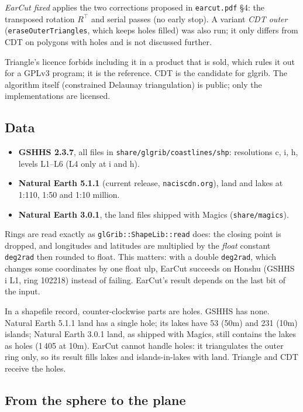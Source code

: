 \documentclass[11pt,a4paper]{article}
\newcommand{\code}[1]{\texttt{#1}}
\begin{document}
\noindent\emph{EarCut fixed} applies the two corrections proposed in \code{earcut.pdf} \S4:
the transposed rotation $R^\top$ and serial passes (no early stop). A variant \emph{CDT outer}
(\code{eraseOuterTriangles}, which keeps holes filled) was also run; it only differs from CDT on
polygons with holes and is not discussed further.

Triangle's licence forbids including it in a product that is sold, which rules it out for a
GPLv3 program; it is the reference. CDT is the candidate for glgrib. The algorithm itself
(constrained Delaunay triangulation) is public; only the implementations are licensed.

\subsection{Data}

\begin{itemize}
\item \textbf{GSHHS 2.3.7}, all files in \code{share/glgrib/coastlines/shp}: resolutions c, i, h,
  levels L1--L6 (L4 only at i and h).
\item \textbf{Natural Earth 5.1.1} (current release, \code{naciscdn.org}), land and lakes at
  1:110, 1:50 and 1:10 million.
\item \textbf{Natural Earth 3.0.1}, the land files shipped with Magics (\code{share/magics}).
\end{itemize}

Rings are read exactly as \code{glGrib::ShapeLib::read} does: the closing point is dropped, and
longitudes and latitudes are multiplied by the \emph{float} constant \code{deg2rad} then rounded
to float. This matters: with a double \code{deg2rad}, which changes some coordinates by one float
ulp, EarCut succeeds on Honshu (GSHHS i L1, ring 102218) instead of failing. EarCut's result
depends on the last bit of the input.

In a shapefile record, counter-clockwise parts are holes. GSHHS has none. Natural Earth 5.1.1 land
has a single hole; its lakes have 53 (50m) and 231 (10m) islands; Natural Earth 3.0.1 land, as
shipped with Magics, still contains the lakes as holes (1\,405 at 10m). EarCut cannot handle
holes: it triangulates the outer ring only, so its result fills lakes and islands-in-lakes with
land. Triangle and CDT receive the holes.

\subsection{From the sphere to the plane}
\end{document}
